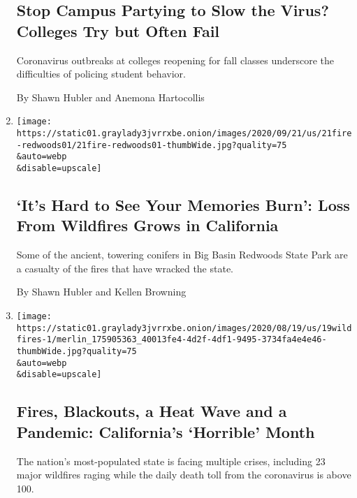 \begin{enumerate}
  \hypertarget{stop-campus-partying-to-slow-the-virus-colleges-try-but-often-fail}{%
  \subsection{Stop Campus Partying to Slow the Virus? Colleges Try but
  Often
  Fail}\label{stop-campus-partying-to-slow-the-virus-colleges-try-but-often-fail}}

  Coronavirus outbreaks at colleges reopening for fall classes
  underscore the difficulties of policing student behavior.

  By Shawn Hubler and Anemona Hartocollis
\item
  \href{/2020/08/21/us/big-basin-redwoods-ca-fires.html}{}

  \texttt{[image: https://static01.graylady3jvrrxbe.onion/images/2020/09/21/us/21fire-redwoods01/21fire-redwoods01-thumbWide.jpg?quality=75\\\&auto=webp\\\&disable=upscale]}

  \hypertarget{its-hard-to-see-your-memories-burn-loss-from-wildfires-grows-in-california}{%
  \subsection{`It's Hard to See Your Memories Burn': Loss From Wildfires
  Grows in
  California}\label{its-hard-to-see-your-memories-burn-loss-from-wildfires-grows-in-california}}

  Some of the ancient, towering conifers in Big Basin Redwoods State
  Park are a casualty of the fires that have wracked the state.

  By Shawn Hubler and Kellen Browning
\item
  \href{/2020/08/19/us/california-heatwave-blackouts-wildfires.html}{}

  \texttt{[image: https://static01.graylady3jvrrxbe.onion/images/2020/08/19/us/19wildfires-1/merlin\_175905363\_40013fe4-4d2f-4df1-9495-3734fa4e4e46-thumbWide.jpg?quality=75\\\&auto=webp\\\&disable=upscale]}

  \hypertarget{fires-blackouts-a-heat-wave-and-a-pandemic-californias-horrible-month}{%
  \subsection{Fires, Blackouts, a Heat Wave and a Pandemic: California's
  `Horrible'
  Month}\label{fires-blackouts-a-heat-wave-and-a-pandemic-californias-horrible-month}}

  The nation's most-populated state is facing multiple crises, including
  23 major wildfires raging while the daily death toll from the
  coronavirus is above 100.


\end{enumerate}
